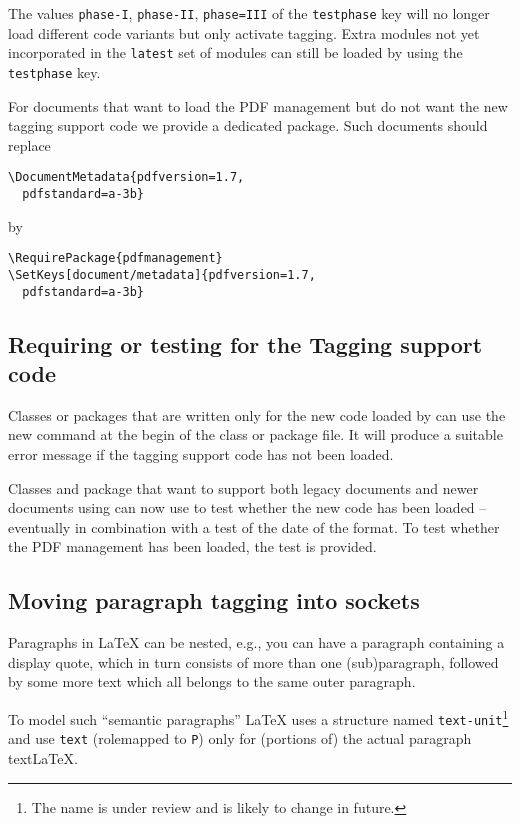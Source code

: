 \documentclass{ltnews}
\begin{document}
The values \texttt{phase-I}, \texttt{phase-II}, \texttt{phase=III} of the
\texttt{testphase} key will no longer load different code variants but only
activate tagging. Extra modules not yet incorporated in the \texttt{latest} set of
modules can still be loaded by using  the \texttt{testphase} key.

For documents that want to load the PDF management but do not want the new tagging support
code we provide a dedicated package. Such documents should replace
\begin{verbatim}
\DocumentMetadata{pdfversion=1.7,
  pdfstandard=a-3b}
\end{verbatim}
by
\begin{verbatim}
\RequirePackage{pdfmanagement}
\SetKeys[document/metadata]{pdfversion=1.7,
  pdfstandard=a-3b}
\end{verbatim}


\subsection{Requiring or testing for the Tagging support code}

Classes or packages that are written only for the new code loaded by
 can use the new command  at the begin
of the class or package file. It will produce a suitable error message if
the tagging support code has not been loaded.

Classes and package that want to support both legacy documents and newer documents
using  can now use  to test whether the
new code has been loaded -- eventually in combination with a test of the date of
the format. To test whether the PDF management has been loaded, the test
 is provided.

 
\subsection{Moving paragraph tagging into sockets}

Paragraphs in \LaTeX{} can be nested, e.g., you can have a paragraph
containing a display quote, which in turn consists of more than one
(sub)paragraph, followed by some more text which all belongs to the
same outer paragraph.

To model such \enquote{semantic paragraphs} \LaTeX{} uses a structure named 
\texttt{text-unit}\footnote{The name is under review and is likely to change in future.}
and use \texttt{text} (rolemapped to \texttt{P}) only for (portions of) 
the actual paragraph text\LaTeX{}. 
\end{document}
